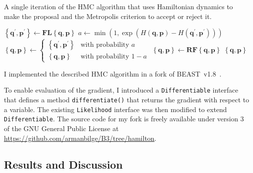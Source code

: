 \documentclass{article}
\renewcommand{\vec}[1]{\ensuremath{\mathbf{#1}}}
\newcommand{\op}[1]{\ensuremath{\mathbf{#1}}}
\begin{document}
    \begin{algorithm}
        \caption{A single iteration of the \acl{HMC} algorithm that uses
                 Hamiltonian dynamics to make the proposal and the Metropolis
                 criterion to accept or reject it.}
        \begin{algorithmic}[1]
        \Function {HamiltonUpdate}{$\left\{\vec{q},\vec{p}\right\}$}
            \State $\left\{\vec{q}^\prime, \vec{p}^\prime\right\}
                \leftarrow \op{F}\op{L}\left\{\vec{q},\vec{p}\right\}$
            \State $a \leftarrow \min\left(1,
                \exp\left(
                    H\left(\vec{q}, \vec{p}\right) - H\left(\vec{q}^\prime,
                        \vec{p}^\prime\right)\right)\right)$
            \State $\left\{\vec{q},\vec{p}\right\} \leftarrow
                \begin{cases}
                    \left\{\vec{q}^\prime, \vec{p}^\prime\right\}
                        & \text{with probability } a \\
                    \left\{\vec{q},\vec{p}\right\}
                        & \text{with probability } 1 - a
                \end{cases}$
            \State $\left\{\vec{q},\vec{p}\right\} \leftarrow
                        \op{R}\op{F}\left\{\vec{q},\vec{p}\right\}$
            \State \Return $\left\{\vec{q},\vec{p}\right\}$
        \EndFunction
        \end{algorithmic}
    \end{algorithm}

    I implemented the described \ac{HMC} algorithm in a fork of
        BEAST~v1.8~\cite{Dru+12}.

    To enable evaluation of the gradient, I introduced a
        \texttt{Differentiable} interface that defines a method
        \texttt{differentiate()} that returns the gradient with respect to a
        variable.
    The existing \texttt{Likelihood} interface was then modified to extend
        \texttt{Differentiable}.
    The source code for my fork is freely available under version 3 of the GNU
        General Public License at
        \url{https://github.com/armanbilge/B3/tree/hamilton}.

    \subsection*{Results and Discussion}

    \printbibliography
\end{document}
